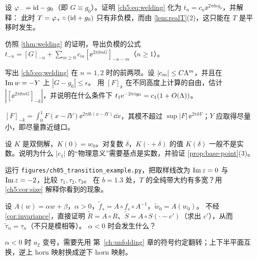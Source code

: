 \begin{exercise}\label{ch5:ex:welding-trivial}
设 $\varphi_-=\mathrm{id}-g_0$（即 $G\equiv g_0$）。证明 \eqref{ch5:eq:welding} 化为 $t_n=c_n\ee^{2\pi\ii ng_0}$，并解释：
此时 $T=\varphi_+\circ(\mathrm{id}+g_0)$ 只有非负模，而由 \cref{lem:realT}(2)，这只能在 $T$ 是平移时发生。
\end{exercise}

\begin{exercise}\label{ch5:ex:negative}
仿照 \cref{thm:welding} 的证明，导出负模的公式 $t_{-n}=[G]_{-n}+\sum_{m\ge0}c_m[\ee^{2\pi\ii mG}]_{-n-m}$（$n\ge1$）。
\end{exercise}

\begin{exercise}\label{ch5:ex:first-two}
写出 \eqref{ch5:eq:welding} 在 $n=1,2$ 时的前两项。设 $|c_m|\le C\Lambda^m$，并且在 $\operatorname{Im} w=-Y$ 上 $|G-g_0|\le\epsilon$。
用 $[F]_k$ 在不同高度上计算的自由，估计 $|[\ee^{2\pi\ii mG}]_{-k}|$，并说明在什么条件下 $t_1\mathrm{e}^{-2\pi\mathrm{i} g_0}=c_1(1+O(\Lambda))$。
\end{exercise}
\begin{hint}
$[F]_{-k}=\int_0^1F(x-\ii Y)\ee^{2\pi\ii k(x-\ii Y)}\dd x$，其模不超过 $\sup|F|\,\ee^{2\pi kY}$；$Y$ 应取得尽量小，即尽量靠近缝口。
\end{hint}

\begin{exercise}\label{ch5:ex:gauge}
设 $K$ 是双侧解，$K(0)=w_0$。对复数 $\delta$，$K(\cdot+\delta)$ 的值 $K(\delta)$ 一般不是实数。说明为什么
$|c_1|$ 的``物理意义''需要基点是实数，并验证 \cref{prop:base-point}(3)。
\end{exercise}

\begin{exercise}\label{ch5:ex:numerics}
运行 \texttt{figures/ch05\_transition\_example.py}，把取样线改为 $\operatorname{Im} z=0$ 与 $\operatorname{Im} z=-2$，比较 $\tau_1,\tau_2,\tau_3$。
在 $b=1.3$ 处，$T$ 的全纯带大约有多宽？用 \cref{ch5:cor:size} 解释你看到的现象。
\end{exercise}

\begin{exercise}\label{ch5:ex:invariance-quad}
设 $A(w)=\alpha w+\beta$，$\alpha>0$，$\tilde f_s=A\circ f_s\circ A^{-1}$，$\tilde w_0=A(w_0)$。
不经 \cref{cor:invariance}，直接证明 $\tilde R=A\circ R$、$\tilde S=A\circ S(\cdot-c')$（求出 $c'$），从而 $\tilde\tau_n=\tau_n$（不只是模相等）。
$\alpha<0$ 时会发生什么？
\end{exercise}
\begin{hint}
$\alpha<0$ 时 $a_2$ 变号，需要先用 第~\ref{ch:unfolding} 章的符号约定翻转；上下半平面互换，逆上 horn 映射换成逆下 horn 映射。
\end{hint}
